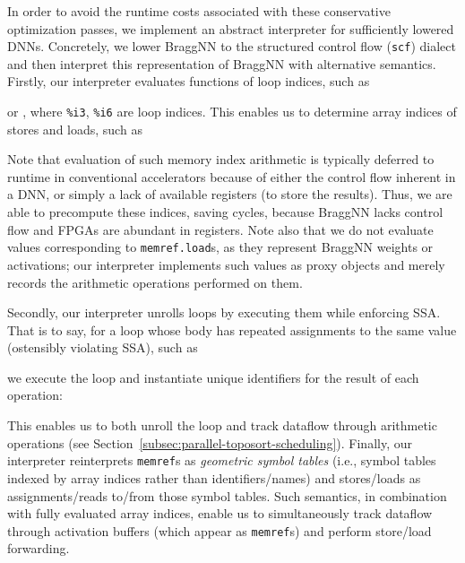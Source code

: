 In order to avoid the runtime costs associated with these conservative optimization passes, we implement an abstract interpreter for sufficiently lowered DNNs.
Concretely, we lower BraggNN to the structured control flow (\texttt{scf}) dialect and then interpret this representation of BraggNN with alternative semantics.
Firstly, our interpreter evaluates functions of loop indices, such as 
\begin{mylistingnocap}
	
\end{mylistingnocap}
or {}, where \texttt{\%i3}, \texttt{\%i6} are loop indices.
This enables us to determine array indices of stores and loads, such as 
\begin{mylistingnocap}
	
\end{mylistingnocap}
Note that evaluation of such memory index arithmetic is typically deferred to runtime in conventional accelerators because of either the control flow inherent in a DNN, or simply a lack of available registers (to store the results).
Thus, we are able to precompute these indices, saving cycles, because BraggNN lacks control flow and FPGAs are abundant in registers.
Note also that we do not evaluate values corresponding to \texttt{memref.load}s, as they represent BraggNN weights or activations; our interpreter implements such values as proxy objects and merely records the arithmetic operations performed on them.

Secondly, our interpreter unrolls loops by executing them while enforcing SSA.
That is to say, for a loop whose body has repeated assignments to the same value (ostensibly violating SSA), such as 
\begin{mylistingnocap}
	
\end{mylistingnocap}
we execute the loop and instantiate unique identifiers for the result of each operation:
\begin{mylistingnocap}
	
\end{mylistingnocap}
This enables us to both unroll the loop and track dataflow through arithmetic operations (see Section~\ref{subsec:parallel-toposort-scheduling}).
Finally, our interpreter reinterprets \texttt{memref}s as \emph{geometric symbol tables} (i.e., symbol tables indexed by array indices rather than identifiers/names) and stores/loads as assignments/reads to/from those symbol tables.
Such semantics, in combination with fully evaluated array indices, enable us to simultaneously track dataflow through activation buffers (which appear as \texttt{memref}s) and perform store/load forwarding.

